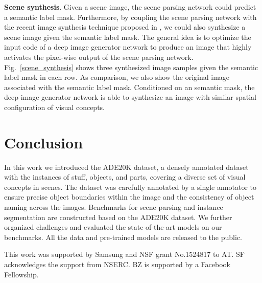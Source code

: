 \textbf{Scene synthesis}. Given a scene image, the scene parsing network could predict a semantic label mask. Furthermore, by coupling the scene parsing network with the recent image synthesis technique proposed in \cite{nguyen2016synthesizing}, we could also synthesize a scene image given the semantic label mask. The general idea is to optimize the input code of a deep image generator network to produce an image that highly activates the pixel-wise output of the scene parsing network. Fig.~\ref{scene_synthesis} shows three synthesized image samples given the semantic label mask in each row. As comparison, we also show the original image associated with the semantic label mask. Conditioned on an semantic mask, the deep image generator network is able to synthesize an image with similar spatial configuration of visual concepts.

\section{Conclusion}
\label{section:conclusion}
In this work we introduced the ADE20K dataset, a densely annotated dataset with the instances of stuff, objects, and parts, covering a diverse set of visual concepts in scenes. The dataset was carefully annotated by a single annotator to ensure precise object boundaries within the image and the consistency of object naming across the images. Benchmarks for scene parsing and instance segmentation are constructed based on the ADE20K dataset. We further organized challenges and evaluated the state-of-the-art models on our benchmarks. All the data and pre-trained models are released to the public.

\begin{acknowledgements}
This work was supported by Samsung and NSF grant No.1524817 to AT. SF acknowledges the support from NSERC. BZ is supported by a Facebook Fellowship. 
\end{acknowledgements}


